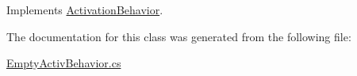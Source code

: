 Implements \mbox{\hyperlink{interface_activation_behavior_a6c7af51cf1b10eaadcbf086231e5539b}{Activation\+Behavior}}.



The documentation for this class was generated from the following file\+:\begin{DoxyCompactItemize}
\item 
\mbox{\hyperlink{_empty_activ_behavior_8cs}{Empty\+Activ\+Behavior.\+cs}}\end{DoxyCompactItemize}
